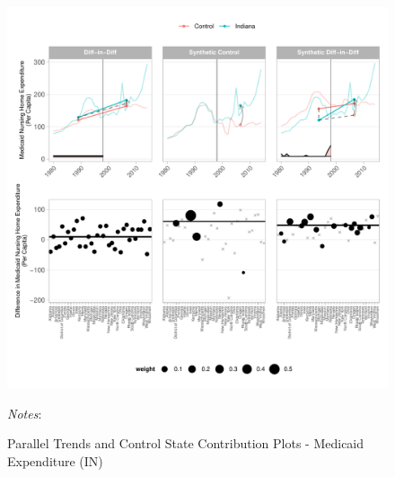\documentclass[12pt]{article}
\begin{document}
\newpage
\begin{figure}[t]
	\begin{center}
	\caption{\centering Parallel Trends and Control State Contribution Plots - Medicaid Expenditure (IN)}
    \includegraphics[width=\textwidth,keepaspectratio]{medicaid_expenditure_plots_IN.pdf}
    \end{center}
    \footnotesize
		\textit{Notes}:
\end{figure}
\clearpage
\end{document}
